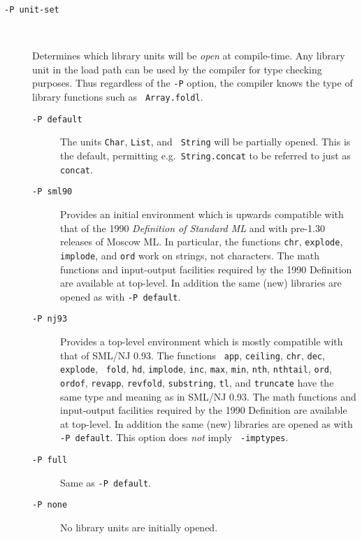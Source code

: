 \documentclass[fleqn,a4paper]{article}
\begin{document}
\begin{description}
\item[{\tt -P {\rm unit-set}}]\mbox{ }

  Determines which library units will be {\em open\/} at compile-time.
  Any library unit in the load path can be used by the compiler for
  type checking purposes.  Thus regardless of the {\tt -P} option, the
  compiler knows the type of library functions such as {\tt
    Array.foldl}.

  \begin{description}
  \item[{\tt -P default}] The units {\tt Char}, {\tt List}, and {\tt
      String} will be partially opened.  This is the default,
    permitting e.g.\ {\tt String.concat} to be referred to just as
    {\tt concat}.

  \item[{\tt -P sml90}] Provides an initial environment which is
    upwards compatible with that of the 1990 {\em Definition of
      Standard ML\/} and with pre-1.30 releases of Moscow ML\@.  In
    particular, the functions {\tt chr}, {\tt explode}, {\tt implode},
    and {\tt ord} work on strings, not characters.  The math functions
    and input-output facilities required by the 1990 Definition
    \cite[Appendix C and D]{Milner:1990:TheDefinition} are available
    at top-level.  In addition the same (new) libraries are opened as
    with {\tt -P default}.

  \item[{\tt -P nj93}] Provides a top-level environment which is
    mostly compatible with that of SML/NJ 0.93.  The functions {\tt
      app}, {\tt ceiling}, {\tt chr}, {\tt dec}, {\tt explode}, {\tt
      fold}, {\tt hd}, {\tt implode}, {\tt inc}, {\tt max}, {\tt min},
    {\tt nth}, {\tt nthtail}, {\tt ord}, {\tt ordof}, {\tt revapp},
    {\tt revfold}, {\tt substring}, {\tt tl}, and {\tt truncate} have
    the same type and meaning as in SML/NJ 0.93.  The math functions
    and input-output facilities required by the 1990 Definition
    \cite[Appendix C and D]{Milner:1990:TheDefinition} are available
    at top-level.  In addition the same (new) libraries are opened as
    with {\tt -P default}.  This option does {\em not\/} imply {\tt
      -imptypes}.

  \item[{\tt -P full}] Same as {\tt -P default}.

  \item[{\tt -P none}] No library units are initially opened.
  \end{description}
  

\end{description}
\end{document}
